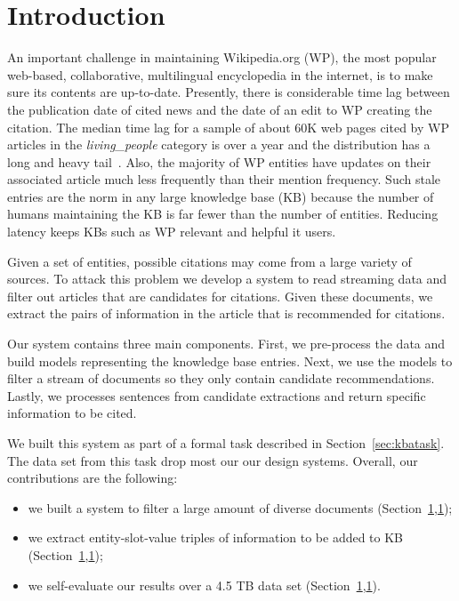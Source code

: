 
\section{Introduction}


An important challenge in maintaining Wikipedia.org (WP), the most popular 
web-based, collaborative, multilingual encyclopedia in the internet, is to 
make sure its contents are up-to-date. Presently, there is considerable time lag 
between the publication date of cited news and the date of an edit to WP 
creating the citation. The median time lag for a sample of about 60K
web pages cited by WP articles in the \textit{living\_people} category is over 
a year and the distribution has a long and heavy tail~\cite{JFrank12}. 
Also, the majority of WP entities have updates on their associated article much 
less frequently than their mention frequency. Such stale entries 
are the norm in any large knowledge base (KB) because the number of humans 
maintaining the KB is far fewer than the number of entities. 
Reducing latency keeps KBs such as WP relevant and helpful it users.

Given a set of entities, possible citations may come from a large variety of sources.
To attack this problem we develop a system to read streaming data and
filter out articles that are candidates for citations.
Given these documents, we extract the pairs of information in the 
article that is recommended for citations.

Our system contains three main components. First, we pre-process the data and
build models representing the knowledge base entries.
Next, we use the models to filter a stream of documents so they only contain 
candidate recommendations.
Lastly, we processes sentences from candidate extractions and return 
specific information to be cited.


We built this system as part of a formal task described in Section~\ref{sec:kbatask}.
The data set from this task drop most our our design systems.
Overall, our contributions are the following:
\begin{itemize}[noitemsep,nolistsep]
\item we built a system to filter a large amount of diverse documents (Section~\ref{},\ref{});
\item we extract entity-slot-value triples of information to be added to KB (Section~\ref{},\ref{});
\item we self-evaluate our results over a 4.5 TB data set (Section~\ref{},\ref{}).
\end{itemize}


